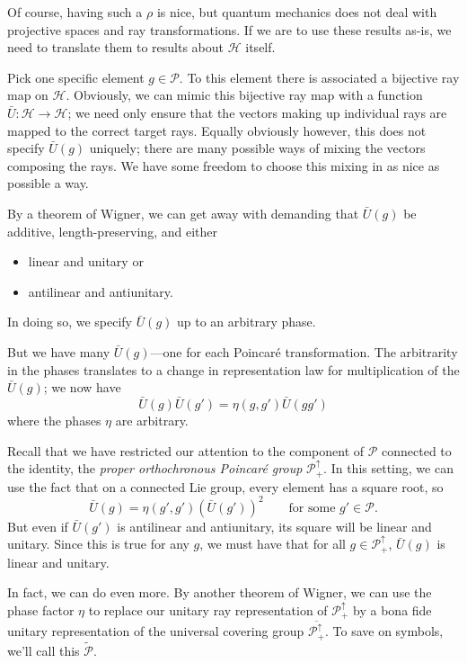 \documentclass[a4paper,10pt]{scrreprt}
\theoremstyle{definition}
\theoremstyle{plain}
\theoremstyle{remark}
\begin{document}
Of course, having such a $\rho$ is nice, but quantum mechanics does not deal with projective spaces and ray transformations. If we are to use these results as-is, we need to translate them to results about $\mathscr{H}$ itself.

Pick one specific element $g \in \mathcal{P}$. To this element there is associated a bijective ray map on $\mathscr{H}$. Obviously, we can mimic this bijective ray map with a function $\bar{U}\colon \mathscr{H} \to \mathscr{H}$; we need only ensure that the vectors making up individual rays are mapped to the correct target rays. Equally obviously however, this does not specify $\bar{U}(g)$ uniquely; there are many possible ways of mixing the vectors composing the rays. We have some freedom to choose this mixing in as nice as possible a way.

By a theorem of Wigner, we can get away with demanding that $\bar{U}(g)$ be additive, length-preserving, and either
\begin{itemize}
  \item linear and unitary or
  \item antilinear and antiunitary.
\end{itemize}
In doing so, we specify $\bar{U}(g)$ up to an arbitrary phase.

But we have many $\bar{U}(g)$---one for each Poincar{\'e} transformation. The arbitrarity in the phases translates to a change in representation law for multiplication of the $\bar{U}(g)$; we now have 
\begin{equation*}
  \bar{U}(g) \bar{U}(g') = \eta(g, g')\bar{U}(gg')
\end{equation*}
where the phases $\eta$ are arbitrary.

Recall that we have restricted our attention to the component of $\mathcal{P}$ connected to the identity, the \emph{proper orthochronous Poincar{\'e} group} $\mathcal{P}_{+}^{\uparrow}$. In this setting, we can use the fact that on a connected Lie group, every element has a square root, so
\begin{equation*}
  \bar{U}(g) = \eta(g',g')(\bar{U}(g'))^{2}\qquad\text{for some }g' \in \mathcal{P}.
\end{equation*}
But even if $\bar{U}(g')$ is antilinear and antiunitary, its square will be linear and unitary. Since this is true for any $g$, we must have that for all $g \in \mathcal{P}_{+}^{\uparrow}$, $\bar{U}(g)$ is linear and unitary.

In fact, we can do even more. By another theorem of Wigner, we can use the phase factor $\eta$ to replace our unitary ray representation of $\mathcal{P}_{+}^{\uparrow}$ by a bona fide unitary representation of the universal covering group $\overline{\mathcal{P}_{+}^{\uparrow}}$. To save on symbols, we'll call this $\widetilde{\mathcal{P}}$.
\end{document}
